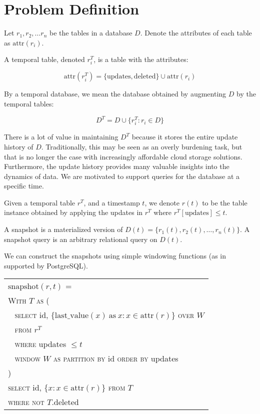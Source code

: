 \newcommand{\attr}{\mathrm{attr}}

\section{Problem Definition}

\begin{definition}
    Let $r_1, r_2, \dots r_n$ be the tables
    in a database $D$.  Denote the attributes
    of each table as $\attr(r_i)$.

    A temporal table, denoted $r_i^T$, is
    a table with the attributes:

    $$\attr(r_i^T) = \{\mathrm{updates}, \mathrm{deleted}\} \cup \attr(r_i)$$

    By a temporal database, we mean the database obtained by augmenting
    $D$ by the temporal tables:

    $$ D^T = D \cup \{r_i^T: r_i\in D\} $$
\end{definition}

There is a lot of value in maintaining $D^T$ because it stores the entire update
history of $D$.  Traditionally, this may be seen as an overly burdening task,
but that is no longer the case with increasingly affordable cloud storage
solutions.  Furthermore, the update history provides many valuable insights into
the dynamics of data. We are motivated to support queries for the database at a
specific time.

\begin{definition}
    Given a temporal table $r^T$, and a timestamp $t$, we denote
    $r(t)$ to be the table instance obtained by applying the updates
    in $r^T$ where $r^T[\mathrm{updates}] \leq t$.

    A snapshot is a materialized version of $D(t) = \{r_1(t), r_2(t), \dots,
    r_n(t)\}$.  A snapshot query is an arbitrary relational query on $D(t)$.
\end{definition}

We can construct the snapshots using simple windowing functions (as in supported
by PostgreSQL).


\vspace{1em}

{\small
\begin{tabular}{|l|} \hline
    $\mathrm{snapshot}(r, t)$ = \\
    \verb|| \textsc{With} $T$ \textsc{as} ( \\
    \verb| | \textsc{select} id, $\{\mathrm{last\_value}(x) \mathrm{\ as\ } x:
    x\in\attr(r)\}$ \textsc{over} $W$ \\
    \verb| | \textsc{from} $r^T$ \\
    \verb| | \textsc{where} updates $\leq t$ \\
    \verb| | \textsc{window} $W$ \textsc{as} 
             \textsc{partition by} id \textsc{order by} updates\\
    \verb|| ) \\
    \verb|| \textsc{select} id, $\{x: x\in\attr(r)\}$ \textsc{from} $T$ \\
    \verb|| \textsc{where not} $T.$deleted \\ \hline
\end{tabular}
}


